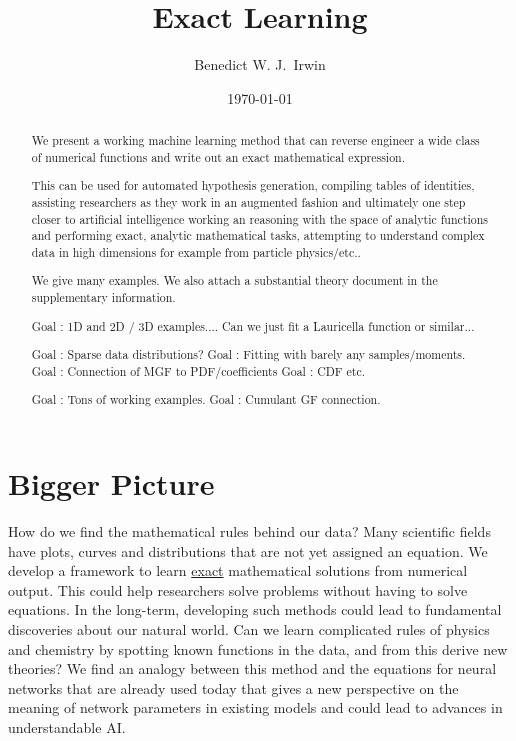 \documentclass{article}
\title{Exact Learning}
\date{\today}
\begin{document}
%

\author[1]{Benedict W. J.~Irwin}


\maketitle

\begin{abstract}
We present a working machine learning method that can reverse engineer a wide class of numerical functions and write out an exact mathematical expression.

This can be used for automated hypothesis generation, compiling tables of identities, assisting researchers as they work in an augmented fashion and ultimately one step closer to artificial intelligence working an reasoning with the space of analytic functions and performing exact, analytic mathematical tasks, attempting to understand complex data in high dimensions for example from particle physics/etc..

We give many examples.
We also attach a substantial theory document in the supplementary information.

Goal : 1D and 2D / 3D examples.... Can we just fit a Lauricella function or similar...


Goal : Sparse data distributions?
Goal : Fitting with barely any samples/moments.
Goal : Connection of MGF to PDF/coefficients
Goal : CDF etc.

Goal : Tons of working examples.
Goal : Cumulant GF connection.

\end{abstract}


\section{Bigger Picture}
How do we find the mathematical rules behind our data? Many scientific fields have plots, curves and distributions that are not yet assigned an equation. We develop a framework to learn \underline{exact} mathematical solutions from numerical output. This could help researchers solve problems without having to solve equations.
In the long-term, developing such methods could lead to fundamental discoveries about our natural world. Can we learn complicated rules of physics and chemistry by spotting known functions in the data, and from this derive new theories?
We find an analogy between this method and the equations for neural networks that are already used today that gives a new perspective on the meaning of network parameters in existing models and could lead to advances in understandable AI. 
\end{document}
